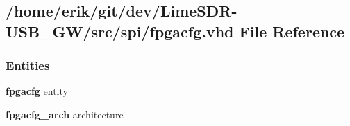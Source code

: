 \subsection{/home/erik/git/dev/\+Lime\+S\+D\+R-\/\+U\+S\+B\+\_\+\+G\+W/src/spi/fpgacfg.vhd File Reference}
\label{fpgacfg_8vhd}
\subsubsection*{Entities}
\begin{DoxyCompactItemize}
\item 
{\bf fpgacfg} entity
\item 
{\bf fpgacfg\+\_\+arch} architecture
\end{DoxyCompactItemize}
